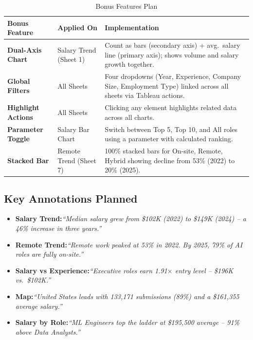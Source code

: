\documentclass[12pt,a4paper]{article}
\begin{document}
\begin{table}[H]
\centering
\caption{Bonus Features Plan}
\small
\renewcommand{\arraystretch}{1.3}

\begin{tabularx}{\linewidth}{
  >{\bfseries\RaggedRight\arraybackslash}p{2.4cm}
  >{\RaggedRight\arraybackslash}p{2.3cm}
  X
}
\toprule
\textbf{Bonus Feature} & \textbf{Applied On} & \textbf{Implementation} \\
\midrule

Dual-Axis Chart
  & Salary Trend (Sheet 1)
  & Count as bars (secondary axis) + avg.\ salary line (primary axis);
    shows volume and salary growth together. \\

Global Filters
  & All Sheets
  & Four dropdowns (Year, Experience, Company Size, Employment Type)
    linked across all sheets via Tableau actions. \\

Highlight Actions
  & All Sheets
  & Clicking any element highlights related data across all charts. \\

Parameter Toggle
  & Salary Bar Chart
  & Switch between Top 5, Top 10, and All roles using a parameter
    with calculated ranking. \\

Stacked Bar
  & Remote Trend (Sheet 7)
  & 100\% stacked bars for On-site, Remote, Hybrid showing decline
    from 53\% (2022) to 20\% (2025). \\

\bottomrule
\end{tabularx}
\end{table}

\subsection{Key Annotations Planned}

\begin{itemize}[leftmargin=2em, itemsep=6pt]
  \item \textbf{Salary Trend:}\enspace\textit{``Median salary grew from \$102K (2022) to \$149K (2024) -- a 46\% increase in three years.''}
  \item \textbf{Remote Trend:}\enspace\textit{``Remote work peaked at 53\% in 2022. By 2025, 79\% of AI roles are fully on-site.''}
  \item \textbf{Salary vs Experience:}\enspace\textit{``Executive roles earn 1.91$\times$ entry level -- \$196K vs.\ \$102K.''}
  \item \textbf{Map:}\enspace\textit{``United States leads with 133{,}171 submissions (89\%) and a \$161{,}355 average salary.''}
  \item \textbf{Salary by Role:}\enspace\textit{``ML Engineers top the ladder at \$195{,}500 average -- 91\% above Data Analysts.''}
\end{itemize}
\end{document}
